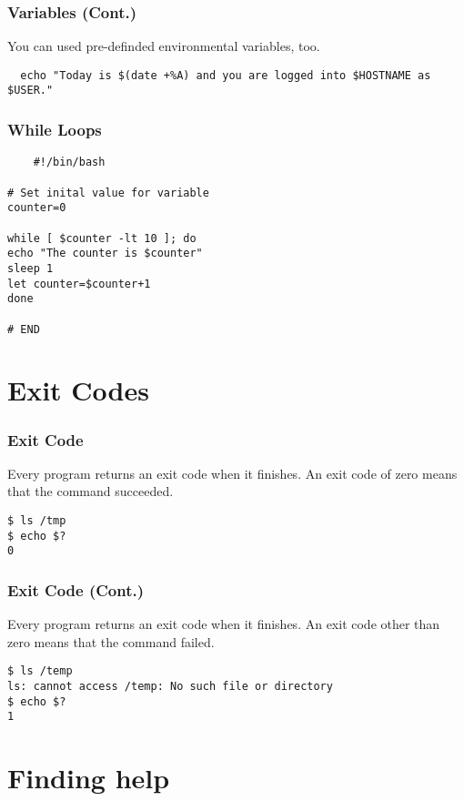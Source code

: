 \documentclass[handout]{beamer}
\begin{document}
\begin{frame}[fragile]
  \frametitle{Variables (Cont.)}
You can used pre-definded environmental variables, too.
\begin{verbatim}
  echo "Today is $(date +%A) and you are logged into $HOSTNAME as $USER."
\end{verbatim}

\end{frame}
\begin{frame}[fragile]
  \frametitle{While Loops}
  \begin{verbatim}
    #!/bin/bash

# Set inital value for variable
counter=0

while [ $counter -lt 10 ]; do
echo "The counter is $counter"
sleep 1
let counter=$counter+1
done

# END
  \end{verbatim}
\end{frame}
\section{Exit Codes}

\begin{frame}[fragile]
  \frametitle{Exit Code}
  Every program returns an exit code when it finishes. An exit code of zero means that the command succeeded.
\begin{verbatim}
$ ls /tmp
$ echo $?
0
\end{verbatim}
\end{frame}
\begin{frame}[fragile]
  \frametitle{Exit Code (Cont.)}
  Every program returns an exit code when it finishes. An exit code other than zero means that the command failed.
\begin{verbatim}
$ ls /temp
ls: cannot access /temp: No such file or directory
$ echo $?
1
\end{verbatim}

\end{frame}
\section{Finding help}
\end{document}
